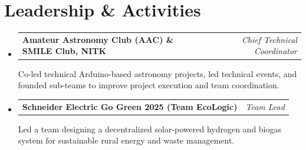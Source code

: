 \documentclass[letterpaper,9pt]{extarticle}
\makeatletter
\newcommand{\resumeLeadershipEntry}[3]{%
  \vspace{1pt}\item
  \begin{tabular*}{0.97\textwidth}[t]{l@{\extracolsep{\fill}}r}
    \textbf{#1} & \small\textit{#2}
  \end{tabular*}\vspace{-1pt}
  \begin{minipage}{0.97\textwidth}
    \small #3
  \end{minipage}\vspace{3pt}
}
\newcommand{\resumeSubHeadingListStart}{\begin{itemize}[leftmargin=0.15in, label={}]}
\newcommand{\resumeSubHeadingListEnd}{\end{itemize}\vspace{-3pt}}
\makeatother
\begin{document}
\vspace{-5pt}

\section{Leadership \& Activities}
\resumeSubHeadingListStart

  \resumeLeadershipEntry
    {Amateur Astronomy Club (AAC) \& SMILE Club, NITK}{Chief Technical Coordinator}
    {Co-led technical Arduino-based astronomy projects, led technical events, and founded sub-teams to improve project execution and team coordination.}

  \resumeLeadershipEntry
    {Schneider Electric Go Green 2025 (Team EcoLogic)}{Team Lead}
    {Led a team designing a decentralized solar-powered hydrogen and biogas system for sustainable rural energy and waste management.}

\resumeSubHeadingListEnd
\end{document}
